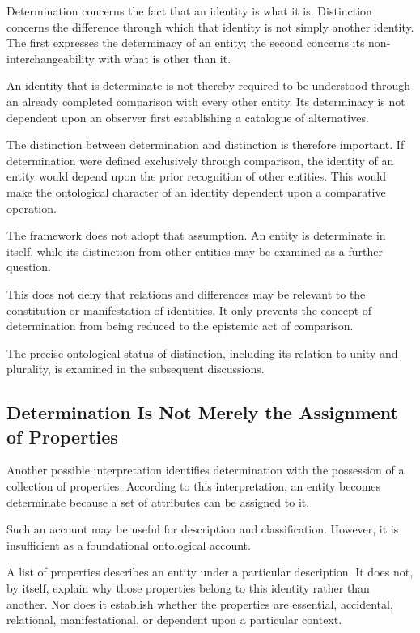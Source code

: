 Determination concerns the fact that an identity is what it is.
Distinction concerns the difference through which that identity is
not simply another identity. The first expresses the determinacy of
an entity; the second concerns its non-interchangeability with what
is other than it.

An identity that is determinate is not thereby required to be
understood through an already completed comparison with every other
entity. Its determinacy is not dependent upon an observer first
establishing a catalogue of alternatives.

The distinction between determination and distinction is therefore
important. If determination were defined exclusively through
comparison, the identity of an entity would depend upon the prior
recognition of other entities. This would make the ontological
character of an identity dependent upon a comparative operation.

The framework does not adopt that assumption. An entity is
determinate in itself, while its distinction from other entities
may be examined as a further question.

This does not deny that relations and differences may be relevant
to the constitution or manifestation of identities. It only
prevents the concept of determination from being reduced to the
epistemic act of comparison.

The precise ontological status of distinction, including its relation
to unity and plurality, is examined in the subsequent discussions.

\subsection{Determination Is Not Merely the Assignment of Properties}

Another possible interpretation identifies determination with the
possession of a collection of properties. According to this
interpretation, an entity becomes determinate because a set of
attributes can be assigned to it.

Such an account may be useful for description and classification.
However, it is insufficient as a foundational ontological account.

A list of properties describes an entity under a particular
description. It does not, by itself, explain why those properties
belong to this identity rather than another. Nor does it establish
whether the properties are essential, accidental, relational,
manifestational, or dependent upon a particular context.

